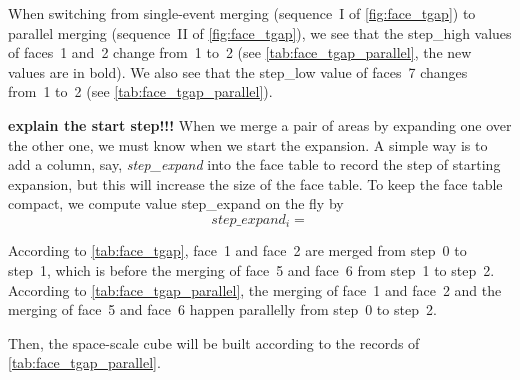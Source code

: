\documentclass[ijgi,article,submit,moreauthors,pdftex]{Definitions/mdpi}
\begin{document}
When switching from single-event merging 
(sequence~I of \fig\ref{fig:face_tgap})
to parallel merging (sequence~II of \fig\ref{fig:face_tgap}),
we see that the step\_high values of faces~1 and~2 change from~1 to~2
(see \tbl\ref{tab:face_tgap_parallel}, the new values are in bold).
We also see that the step\_low value of faces~7 changes from~1 to~2
(see \tbl\ref{tab:face_tgap_parallel}).

\textbf{explain the start step!!!}
When we merge a pair of areas by expanding one over the other one,
we must know when we start the expansion.
A simple way is to add a column, say, \emph{step\_expand} 
into the face table to record the step of starting expansion,
but this will increase the size of the face table.
To keep the face table compact,
we compute value step\_expand on the fly by
$$
step\_expand_i = 
$$


According to \tbl\ref{tab:face_tgap}, 
face~1 and face~2 are merged from step~0 to step~1,
which is before the merging of face~5 and face~6 from step~1 to step~2.
According to \tbl\ref{tab:face_tgap_parallel}, 
the merging of face~1 and face~2 and the merging of face~5 and face~6
happen parallelly from step~0 to step~2.

Then, the space-scale cube will be built 
according to the records of \tbl\ref{tab:face_tgap_parallel}.
\end{document}
